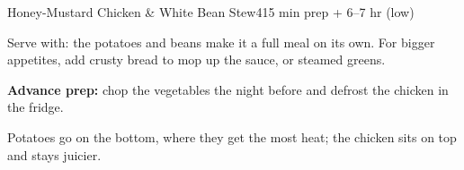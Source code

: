 \begin{recipebox}{Honey-Mustard Chicken \& White Bean Stew}{4}{15 min prep + 6--7 hr (low)}
\begin{notelist}
  \item Serve with: the potatoes and beans make it a full meal on its own.
        For bigger appetites, add crusty bread to mop up the sauce, or steamed
        greens.
  \item \textbf{Advance prep:} chop the vegetables the night before and defrost the chicken in the fridge.
  \item Potatoes go on the bottom, where they get the most heat; the chicken sits on top and stays juicier.
\end{notelist}

\end{recipebox}
